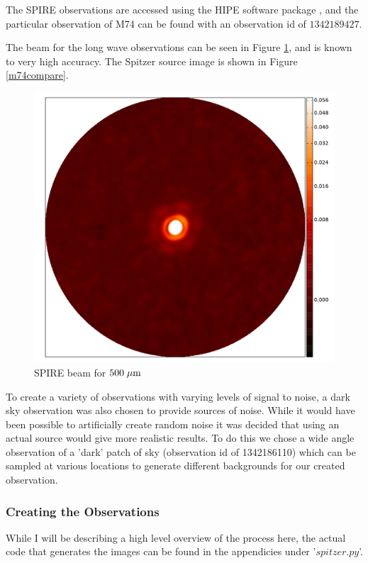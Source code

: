The SPIRE observations are accessed using the HIPE software package \citep{HIPE}, and the particular observation of M74 can be found with an observation id of $1342189427$.

The beam for the long wave observations can be seen in Figure \ref{plwbeam}, and is known to very high accuracy. The Spitzer source image is shown in Figure \ref{m74compare}.

\begin{figure}[H]
    \centering
    \includegraphics[width=0.8\linewidth]{figures/beam.pdf}
    \caption{SPIRE beam for $500\;\mathrm{\mu m}$}
    \label{plwbeam}
\end{figure}

To create a variety of observations with varying levels of signal to noise, a dark sky observation was also chosen to provide sources of noise. While it would have been possible to artificially create random noise it was decided that using an actual source would give more realistic results. To do this we chose a wide angle observation of a 'dark' patch of sky (observation id of 1342186110) which can be sampled at various locations to generate different backgrounds for our created observation.

\subsubsection{Creating the Observations}

While I will be describing a high level overview of the process here, the actual code that generates the images can be found in the appendicies under '$spitzer.py$'.

